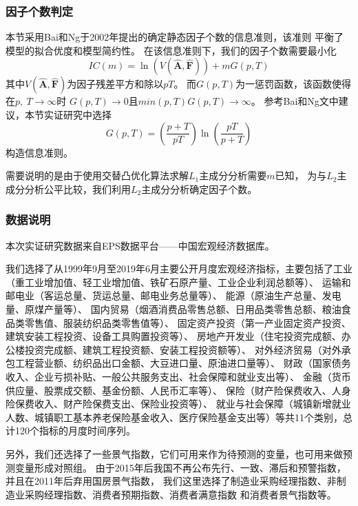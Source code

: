 \subsubsection{因子个数判定}
本节采用Bai和Ng于2002年提出的确定静态因子个数的信息准则\cite{bai2002determining}，该准则
平衡了模型的拟合优度和模型简约性。
在该信息准则下，我们的因子个数需要最小化
\begin{equation}\label{number}
    IC(m) = \ln(V(\hat{\bm{A}}, \hat{\bm{F}})) + mG(p, T)
\end{equation}
其中$V(\hat{\bm{A}}, \hat{\bm{F}})$为因子残差平方和除以$pT$。
而$G(p,T)$为一惩罚函数，该函数使得在$p,\ T \rightarrow \infty$时
$G(p, T) \rightarrow 0$且$min(p, T)G(p,T) \rightarrow \infty$。
参考Bai和Ng文中建议，本节实证研究中选择
$$
    G(p, T) = (\frac{p + T}{pT})\ln(\frac{pT}{p + T})
$$
构造信息准则。

需要说明的是由于使用交替凸优化算法求解$L_1$主成分分析需要$m$已知，
为与$L_2$主成分分析公平比较，我们利用$L_2$主成分分析确定因子个数。

\subsubsection{数据说明}
本次实证研究数据来自EPS数据平台——中国宏观经济数据库。

我们选择了从1999年9月至2019年6月主要公开月度宏观经济指标，主要包括了工业（重工业增加值、轻工业增加值、铁矿石原产量、工业企业利润总额等）、
运输和邮电业（客运总量、货运总量、邮电业务总量等）、
能源（原油生产总量、发电量、原煤产量等）、
国内贸易（烟酒消费品零售总额、日用品类零售总额、粮油食品类零售值、服装纺织品类零售值等）、
固定资产投资（第一产业固定资产投资、建筑安装工程投资、设备工具购置投资等）、
房地产开发业（住宅投资完成额、办公楼投资完成额、建筑工程投资额、安装工程投资额等）、
对外经济贸易（对外承包工程营业额、纺织品出口金额、大豆进口量、原油进口量等）、
财政（国家债务收入、企业亏损补贴、一般公共服务支出、社会保障和就业支出等）、
金融（货币供应量、股票成交额、基金份额、人民币汇率等）、
保险（财产险保费收入、人身险保费收入、财产险保费支出、保险业投资等）、
就业与社会保障（城镇新增就业人数、城镇职工基本养老保险基金收入、医疗保险基金支出等）等共11个类别，总计120个指标的月度时间序列。

另外，我们还选择了一些景气指数，它们可用来作为待预测的变量，也可用来做预测变量形成对照组。
由于2015年后我国不再公布先行、一致、滞后和预警指数，并且在2011年后弃用国房景气指数，
我们这里选择了制造业采购经理指数、非制造业采购经理指数、消费者预期指数、消费者满意指数
和消费者景气指数等。

